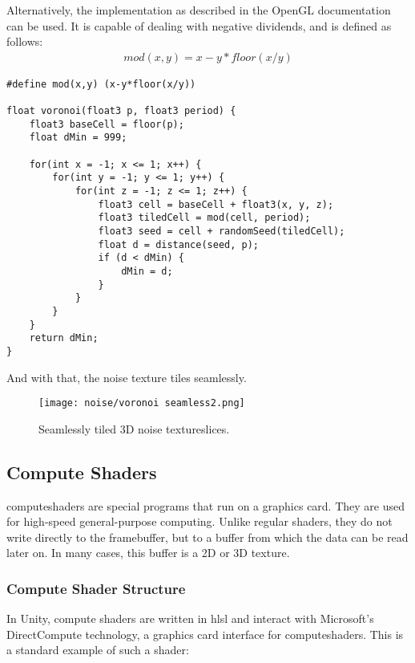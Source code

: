 \noindent
Alternatively, the implementation as described in the OpenGL documentation \cite{opengl:mod} can be used.
It is capable of dealing with negative dividends, and is defined as follows:
$$
\begin{array}{l}
    mod(x, y) = x - y * floor(x/y)
\end{array}
$$

\begin{lstlisting}[language=HLSL, caption=Implementation of seamless 3D Voronoi \gls{noise} algorithm., label=lst:shader:noise:voronoi:seamless2]
#define mod(x,y) (x-y*floor(x/y))

float voronoi(float3 p, float3 period) {
    float3 baseCell = floor(p);
    float dMin = 999;

    for(int x = -1; x <= 1; x++) {
        for(int y = -1; y <= 1; y++) {
            for(int z = -1; z <= 1; z++) {
                float3 cell = baseCell + float3(x, y, z);
                float3 tiledCell = mod(cell, period);
                float3 seed = cell + randomSeed(tiledCell);
                float d = distance(seed, p);
                if (d < dMin) {
                    dMin = d;
                }
            }
        }
    }
    return dMin;
}
\end{lstlisting}

\noindent
And with that, the \gls{noise} texture tiles seamlessly.

\begin{figure}[H]
    \texttt{[image: noise/voronoi seamless2.png]}
    \caption{Seamlessly tiled 3D \gls{noise} \gls{textureslice}s.}
    \label{img:rnd:noise:seamless2}
\end{figure}

\subsection{Compute Shaders}
\label{section:noise:compute}
\Gls{computeshader}s are special programs that run on a graphics card. They are used for high-speed general-purpose computing.
Unlike regular \gls{shader}s, they do not write directly to the \gls{framebuffer}, but to a buffer from which the data can be read later on.
In many cases, this buffer is a 2D or 3D texture.

\subsubsection{Compute Shader Structure}
In Unity, compute shaders are written in \gls{hlsl} and interact with Microsoft's DirectCompute technology, a graphics card interface for \gls{computeshader}s.
This is a standard example of such a \gls{shader}:

